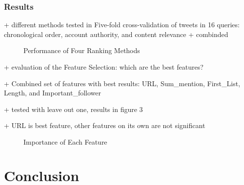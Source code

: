 \documentclass{proseminar}
\begin{document}
\subsubsection*{Results}
+ different methods tested in Five-fold cross-validation of tweets in 16 queries: chronological order, account  authority,  and  content  relevance + combinded
\begin{figure}[h]
\centering
{}
\caption{Performance of Four Ranking Methods}
\end{figure}

+ evaluation of the Feature Selection: which are the best features?

+ Combined set of features with best results: URL, Sum\_mention, First\_List, Length, and Important\_follower

+ tested with leave out one, results in figure 3

+ URL is best feature, other features on its own are not significant

\begin{figure}[h]
\centering
{}
\caption{Importance of Each Feature}
\end{figure}




\section{Conclusion}




  

\balancecolumns
\end{document}

